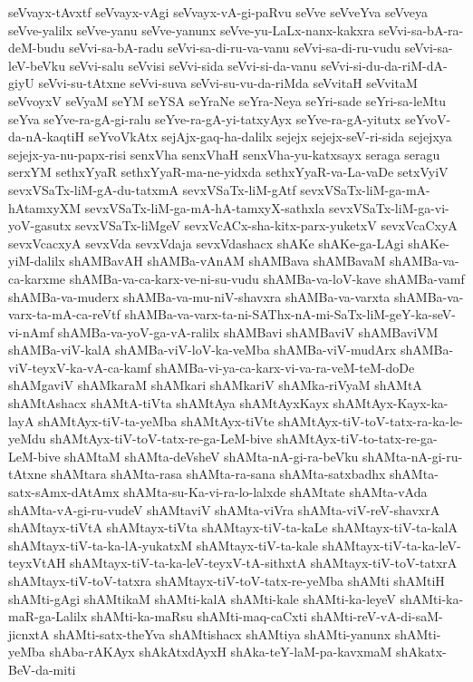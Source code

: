 {seVvayx-tAvxtf
seVvayx-vAgi
seVvayx-vA-gi-paRvu
seVve
seVveYva
seVveya
seVve-yalilx
seVve-yanu
seVve-yanunx
seVve-yu-LaLx-nanx-kakxra
seVvi-sa-bA-ra-deM-budu
seVvi-sa-bA-radu
seVvi-sa-di-ru-va-vanu
seVvi-sa-di-ru-vudu
seVvi-sa-leV-beVku
seVvi-salu
seVvisi
seVvi-sida
seVvi-si-da-vanu
seVvi-si-du-da-riM-dA-giyU
seVvi-su-tAtxne
seVvi-suva
seVvi-su-vu-da-riMda
seVvitaH
seVvitaM
seVvoyxV
seVyaM
seYM
seYSA
seYraNe
seYra-Neya
seYri-sade
seYri-sa-leMtu
seYva
seYve-ra-gA-gi-ralu
seYve-ra-gA-yi-tatxyAyx
seYve-ra-gA-yitutx
seYvoV-da-nA-kaqtiH
seYvoVkAtx
sejAjx-gaq-ha-dalilx
sejejx
sejejx-seV-ri-sida
sejejxya
sejejx-ya-nu-papx-risi
senxVha
senxVhaH
senxVha-yu-katxsayx
seraga
seragu
serxYM
sethxYyaR
sethxYyaR-ma-ne-yidxda
sethxYyaR-va-La-vaDe
setxVyiV
sevxVSaTx-liM-gA-du-tatxmA
sevxVSaTx-liM-gAtf
sevxVSaTx-liM-ga-mA-hAtamxyXM
sevxVSaTx-liM-ga-mA-hA-tamxyX-sathxla
sevxVSaTx-liM-ga-vi-yoV-gasutx
sevxVSaTx-liMgeV
sevxVcACx-sha-kitx-parx-yuketxV
sevxVcaCxyA
sevxVcacxyA
sevxVda
sevxVdaja
sevxVdashacx
shAKe
shAKe-ga-LAgi
shAKe-yiM-dalilx
shAMBavAH
shAMBa-vAnAM
shAMBava
shAMBavaM
shAMBa-va-ca-karxme
shAMBa-va-ca-karx-ve-ni-su-vudu
shAMBa-va-loV-kave
shAMBa-vamf
shAMBa-va-muderx
shAMBa-va-mu-niV-shavxra
shAMBa-va-varxta
shAMBa-va-varx-ta-mA-ca-reVtf
shAMBa-va-varx-ta-ni-SAThx-nA-mi-SaTx-liM-geY-ka-seV-vi-nAmf
shAMBa-va-yoV-ga-vA-ralilx
shAMBavi
shAMBaviV
shAMBaviVM
shAMBa-viV-kalA
shAMBa-viV-loV-ka-veMba
shAMBa-viV-mudArx
shAMBa-viV-teyxV-ka-vA-ca-kamf
shAMBa-vi-ya-ca-karx-vi-va-ra-veM-teM-doDe
shAMgaviV
shAMkaraM
shAMkari
shAMkariV
shAMka-riVyaM
shAMtA
shAMtAshacx
shAMtA-tiVta
shAMtAya
shAMtAyxKayx
shAMtAyx-Kayx-ka-layA
shAMtAyx-tiV-ta-yeMba
shAMtAyx-tiVte
shAMtAyx-tiV-toV-tatx-ra-ka-le-yeMdu
shAMtAyx-tiV-toV-tatx-re-ga-LeM-bive
shAMtAyx-tiV-to-tatx-re-ga-LeM-bive
shAMtaM
shAMta-deVsheV
shAMta-nA-gi-ra-beVku
shAMta-nA-gi-ru-tAtxne
shAMtara
shAMta-rasa
shAMta-ra-sana
shAMta-satxbadhx
shAMta-satx-sAmx-dAtAmx
shAMta-su-Ka-vi-ra-lo-lalxde
shAMtate
shAMta-vAda
shAMta-vA-gi-ru-vudeV
shAMtaviV
shAMta-viVra
shAMta-viV-reV-shavxrA
shAMtayx-tiVtA
shAMtayx-tiVta
shAMtayx-tiV-ta-kaLe
shAMtayx-tiV-ta-kalA
shAMtayx-tiV-ta-ka-lA-yukatxM
shAMtayx-tiV-ta-kale
shAMtayx-tiV-ta-ka-leV-teyxVtAH
shAMtayx-tiV-ta-ka-leV-teyxV-tA-sithxtA
shAMtayx-tiV-toV-tatxrA
shAMtayx-tiV-toV-tatxra
shAMtayx-tiV-toV-tatx-re-yeMba
shAMti
shAMtiH
shAMti-gAgi
shAMtikaM
shAMti-kalA
shAMti-kale
shAMti-ka-leyeV
shAMti-ka-maR-ga-Lalilx
shAMti-ka-maRsu
shAMti-maq-caCxti
shAMti-reV-vA-di-saM-jicnxtA
shAMti-satx-theYva
shAMtishacx
shAMtiya
shAMti-yanunx
shAMti-yeMba
shAba-rAKAyx
shAkAtxdAyxH
shAka-teY-laM-pa-kavxmaM
shAkatx-BeV-da-miti
}
